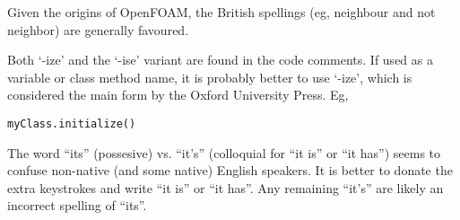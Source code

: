\documentclass[11pt]{article}
\begin{document}
    Given the origins of OpenFOAM, the British spellings (eg, neighbour and not
    neighbor) are generally favoured.

    Both `-ize' and the `-ise' variant are found in the code comments. If
    used as a variable or class method name, it is probably better to use
    `-ize', which is considered the main form by the Oxford University
    Press. Eg,

\begin{verbatim}
myClass.initialize()
\end{verbatim}

    The word ``its'' (possesive) vs. ``it's'' (colloquial for ``it is'' or ``it has'')
    seems to confuse non-native (and some native) English speakers.
    It is better to donate the extra keystrokes and write ``it is'' or ``it has''.
    Any remaining ``it's'' are likely an incorrect spelling of ``its''.
\end{document}
